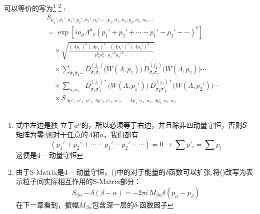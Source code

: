 \begin{tcolorbox}[colback=white!5,colframe=black!45]
    可以等价的写为\footnote{式中左边是独
                    立于$a^\mu$的，所以必须等于右边，并且除非四动量守恒，否则𝑆-矩阵为零;则对于任意的$\Lambda$和$a$，我们都有
                    \[
                    \left( p_1' + p_2' + \cdots - p_1' - p_2' - \cdots \right)=0\longrightarrow\sum p'_i=\sum p_i\]这便是$4-$动量守恒}
                \footnote{由于S-Matrix是$4-$动量守恒，()中的对于能量的$\delta$函数可以扩张,将()改写为表示粒子间实际相互作用的S-Matrix部分：
                    \begin{equation}
                        S_{\beta\alpha}-\delta(\beta-\alpha)=- 2\pi i \, M_{\beta\alpha} \delta(p_{\alpha}-p_{\beta})
                    \end{equation}在下一章看到，振幅$M_{\beta\alpha}$包含深一层的$\delta$-函数因子}
            :
                                \begin{equation}
                                    \begin{aligned}\label{S_matrix_lorentz}
                                        &S_{p_1',\sigma_1',n_1';p_2',\sigma_2',n_2';\cdots;p_1,\sigma_1,n_1;p_2,\sigma_2,n_2;\cdots} \\
                                        &= \exp\!\left[ i a_\mu \Lambda^\mu{}_\nu \left( p_1' + p_2' + \cdots - p_1' - p_2' - \cdots \right)^\nu \right] \\
                                        &\quad\times \sqrt{ \frac{ (\Lambda p_1)^0 (\Lambda p_2)^0 \cdots (\Lambda p_1')^0 (\Lambda p_2')^0 \cdots }{ p_1^0 p_2^0 \cdots p_1'^0 p_2'^0 \cdots } } \\
                                        &\quad\times \sum_{\bar{\sigma}_1 \bar{\sigma}_2 \cdots} D^{(j_1)}_{\bar{\sigma}_1 \sigma_1} \bigl( W(\Lambda, p_1) \bigr) \, D^{(j_2)}_{\bar{\sigma}_2 \sigma_2} \bigl( W(\Lambda, p_2) \bigr) \cdots \\
                                        &\quad\times \sum_{\bar{\sigma}_1 \bar{\sigma}_2 \cdots} D^{(j_1)*}_{\sigma_1 \bar{\sigma}'_1} \bigl( W(\Lambda, p_1') \bigr) \, D^{(j_2)*}_{\sigma_2 \bar{\sigma}'_2} \bigl( W(\Lambda, p_2') \bigr) \cdots \\
                                        &\quad\times S_{\Lambda p'_1,\bar{\sigma}'_1,n'_1;\Lambda p'_2,\bar{\sigma}'_2,n'_2;\cdots;\Lambda p_1,\bar{\sigma}_1,n_1;\Lambda p_2,\bar{\sigma}_2,n_2;\cdots} 
                                    \end{aligned}
                                \end{equation}
\end{tcolorbox}
